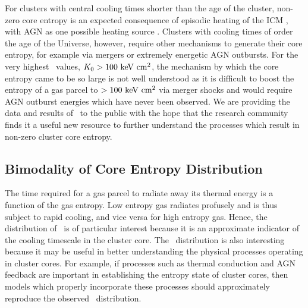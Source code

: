 \documentclass[12pt,preprint]{aastex}
\begin{document}
For clusters with central cooling times shorter than the age of the
cluster, non-zero core entropy is an expected consequence of episodic
heating of the ICM \citep{agnframework}, with AGN as one possible
heating source \citep{1997MNRAS.288..355B, 2000ApJ...532...17L,
2001Natur.414..425V, 2001ApJ...549..832S, 2002MNRAS.332..729C,
2002Natur.418..301B, 2002MNRAS.331..545B, 2002MNRAS.333..145N,
2002ApJ...581..223R, 2002MNRAS.335..610A, 2004MNRAS.348.1105O,
2004ApJ...613..811M, 2004ApJ...615..681R, 2004ApJ...617..896H,
2004MNRAS.355..995D, 2005ApJ...622..847S, pizzolato05,
2006ApJ...643..120B, 2006ApJ...638..659M}. Clusters with cooling times
of order the age of the Universe, however, require other mechanisms to
generate their core entropy, for example via mergers or extremely
energetic AGN outbursts. For the very highest \kna\ values, $K_0 >
100 \mathrm{\mbox{\ensuremath{\mathrm{~keV}}} \mathrm{\mbox{\ensuremath{\mathrm{~cm}}}^2}}$, the mechanism by which the core entropy came to be so large
is not well understood as it is difficult to boost the entropy of a
gas parcel to $> 100 \mathrm{\mbox{\ensuremath{\mathrm{~keV}}} \mathrm{\mbox{\ensuremath{\mathrm{~cm}}}^2}}$ via merger shocks
\citep{2008MNRAS.386.1309M} and would require AGN outburst energies
which have never been observed. We are providing the data and results
of \accept\ to the public with the hope that the research community
finds it a useful new resource to further understand the processes
which result in non-zero cluster core entropy.

\subsection{Bimodality of Core Entropy Distribution}
\label{sec:bimod}

The time required for a gas parcel to radiate away its thermal energy
is a function of the gas entropy. Low entropy gas radiates profusely
and is thus subject to rapid cooling, and vice versa for high entropy
gas. Hence, the distribution of \kna\ is of particular interest
because it is an approximate indicator of the cooling timescale in the
cluster core. The \kna\ distribution is also interesting because it
may be useful in better understanding the physical processes operating
in cluster cores. For example, if processes such as thermal conduction
and AGN feedback are important in establishing the entropy state of
cluster cores, then models which properly incorporate these processes
should approximately reproduce the observed \kna\ distribution.
\end{document}
